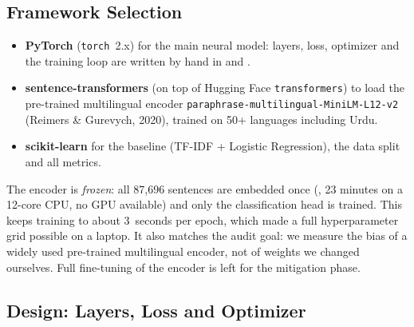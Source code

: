 \documentclass[11pt,a4paper]{article}
\begin{document}
\subsection{Framework Selection}
\begin{itemize}
  \item \textbf{PyTorch} (\texttt{torch}~2.x) for the main neural model: layers, loss,
        optimizer and the training loop are written by hand in  and
        .
  \item \textbf{sentence-transformers} (on top of Hugging Face \texttt{transformers}) to load the
        pre-trained multilingual encoder \texttt{paraphrase-multilingual-MiniLM-L12-v2}
        (Reimers \& Gurevych, 2020), trained on 50+ languages including Urdu.
  \item \textbf{scikit-learn} for the baseline (TF-IDF + Logistic Regression), the data split
        and all metrics.
\end{itemize}
The encoder is \emph{frozen}: all 87,696 sentences are embedded once (, 23
minutes on a 12-core CPU, no GPU available) and only the classification head is trained. This
keeps training to about 3~seconds per epoch, which made a full hyperparameter grid possible
on a laptop. It also matches the audit goal: we measure the bias of a widely used pre-trained
multilingual encoder, not of weights we changed ourselves. Full fine-tuning of the encoder is
left for the mitigation phase.

\subsection{Design: Layers, Loss and Optimizer}
\end{document}
